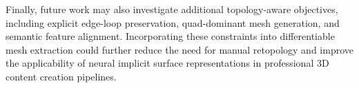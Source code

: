 \documentclass[../main.tex]{subfiles}
\begin{document}
Finally, future work may also investigate additional topology-aware objectives, including explicit edge-loop preservation, quad-dominant mesh generation, and semantic feature alignment. Incorporating these constraints into differentiable mesh extraction could further reduce the need for manual retopology and improve the applicability of neural implicit surface representations in professional 3D content creation pipelines.
\end{document}
